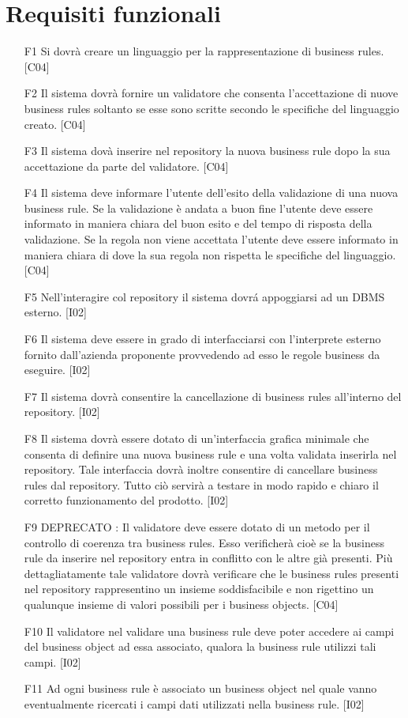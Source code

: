 \section{Requisiti funzionali}
\begin{itemize}
\item[F1]{Si dovr\`a creare un linguaggio per la rappresentazione di business rules. [C04]}
\item[F2]{Il sistema dovr\`a fornire un validatore che consenta l'accettazione di nuove business rules soltanto se esse sono scritte secondo le specifiche del linguaggio creato. [C04]}
\item[F3]{Il sistema dov\`a inserire nel repository la nuova business rule dopo la sua accettazione da parte del validatore. [C04]}
\item[F4]{Il sistema deve informare l'utente dell'esito della validazione di una nuova business rule. Se la validazione \`e andata a buon fine l'utente deve essere informato in maniera chiara del buon esito e del tempo di risposta della validazione. Se la regola non viene accettata l'utente deve essere informato in maniera chiara di dove la sua regola non rispetta le specifiche del linguaggio. [C04]}
\item[F5]{Nell'interagire col repository il sistema dovr\'a appoggiarsi ad un DBMS esterno. [I02]}
\item[F6]{Il sistema deve essere in grado di interfacciarsi con l'interprete esterno fornito dall'azienda proponente provvedendo ad esso le regole business da eseguire. [I02]}
\item[F7]{Il sistema dovr\`a consentire la cancellazione di business rules all'interno del repository. [I02]}
\item[F8]{Il sistema dovr\`a essere dotato di un'interfaccia grafica minimale che consenta di definire una nuova business rule e una volta validata inserirla nel repository. Tale interfaccia dovr\`a inoltre consentire di cancellare business rules dal repository. Tutto ci\`o servir\`a a testare in modo rapido e chiaro il corretto funzionamento del prodotto. [I02]}
\item[F9]{ DEPRECATO : Il validatore deve essere dotato di un metodo per il controllo di coerenza tra business rules. Esso verificher\`a cio\`e se la business rule da inserire nel repository entra in conflitto con le altre gi\`a presenti. Pi\`u dettagliatamente tale validatore dovr\`a verificare che le business rules presenti nel repository rappresentino un insieme soddisfacibile e non rigettino un qualunque insieme di valori possibili per i business objects. [C04]}
\item[F10]{Il validatore nel validare una business rule deve poter accedere ai campi del business object ad essa associato, qualora la business rule utilizzi tali campi. [I02]}
\item[F11]{Ad ogni business rule \`e associato un business object nel quale vanno eventualmente ricercati i campi dati utilizzati nella business rule. [I02]}
\end{itemize}

